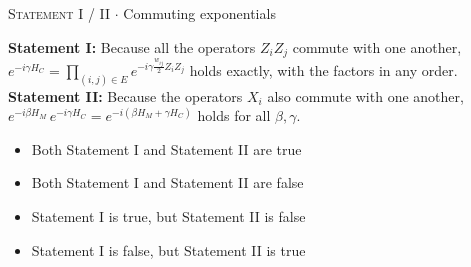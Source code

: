 \documentclass[11pt,a4paper]{article}
\newcommand{\optlabel}[1]{\textbf{(#1)}}
\newcommand{\correctlabel}[1]{\textcolor{okgreen}{\textbf{(#1)}\,\ding{51}}}
\newenvironment{qitem}[1]{\begin{list}{}{\setlength{\leftmargin}{3.3em}\setlength{\labelwidth}{3.1em}%
  \setlength{\labelsep}{0.2em}\setlength{\topsep}{3pt}\setlength{\parsep}{3pt}}\item[\textbf{Q.#1}\hfill]}{\end{list}}
\newcommand{\qmeta}[2]{{\footnotesize\color{black!60}\textsc{#1} \;$\cdot$\; #2}\par}
\begin{document}
\begin{qitem}{11}
\qmeta{Statement I / II}{Commuting exponentials}
\textbf{Statement I:} Because all the operators $Z_iZ_j$ commute with one another,\\
\hspace*{1.5em}$e^{-i\gamma H_C} = \prod_{(i,j)\in E} e^{-i\gamma\frac{w_{ij}}{2} Z_iZ_j}$ holds exactly, with the factors in any order.\\[1mm]
\textbf{Statement II:} Because the operators $X_i$ also commute with one another,\\
\hspace*{1.5em}$e^{-i\beta H_M}\,e^{-i\gamma H_C} = e^{-i(\beta H_M + \gamma H_C)}$ holds for all $\beta, \gamma$.
\begin{itemize}[leftmargin=2.6em, labelsep=0.4em, itemsep=2pt, topsep=3pt]
\item[\optlabel{A}] Both Statement I and Statement II are true
\item[\optlabel{B}] Both Statement I and Statement II are false
\item[\correctlabel{C}] Statement I is true, but Statement II is false
\item[\optlabel{D}] Statement I is false, but Statement II is true
\end{itemize}
\end{qitem}
\end{document}
